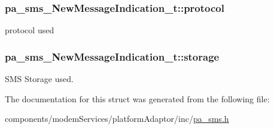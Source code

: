 \subsubsection[{\texorpdfstring{protocol}{protocol}}]{ pa\+\_\+sms\+\_\+\+New\+Message\+Indication\+\_\+t\+::protocol}\hypertarget{structpa__sms___new_message_indication__t_af342f9e0811bc955bf72c334d6ed81bd}{}\label{structpa__sms___new_message_indication__t_af342f9e0811bc955bf72c334d6ed81bd}


protocol used 

\subsubsection[{\texorpdfstring{storage}{storage}}]{ pa\+\_\+sms\+\_\+\+New\+Message\+Indication\+\_\+t\+::storage}\hypertarget{structpa__sms___new_message_indication__t_a4d8bbb87b8616282a0b1fa2765e1c280}{}\label{structpa__sms___new_message_indication__t_a4d8bbb87b8616282a0b1fa2765e1c280}


S\+MS Storage used. 



The documentation for this struct was generated from the following file\+:\begin{DoxyCompactItemize}
\item 
components/modem\+Services/platform\+Adaptor/inc/\hyperlink{pa__sms_8h}{pa\+\_\+sms.\+h}\end{DoxyCompactItemize}
